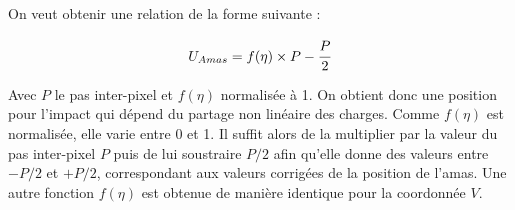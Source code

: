 %    
%    
%    
%    
%    
%    
%    
%    
%    
%    
%    
   
   On veut obtenir une relation de la forme suivante :
   
   \begin{equation}
    U_{Amas} = f(\eta) \times P - \cfrac{P}{2}
   \end{equation}

   Avec $P$ le pas inter-pixel et $f(\eta)$ normalis\'ee \`a 1. On obtient donc une position pour l'impact qui d\'epend du partage non lin\'eaire des charges. Comme $f(\eta)$ est normalis\'ee, elle varie entre 0 et 1. Il suffit alors de la multiplier par la valeur du pas inter-pixel $P$ puis de lui soustraire $P/2$ afin qu'elle donne des valeurs entre $-P/2$ et $+P/2$, correspondant aux valeurs corrig\'ees de la position de l'amas. Une autre fonction $f(\eta)$ est obtenue de mani\`ere identique pour la coordonn\'ee $V$.
   
   \medskip
   
